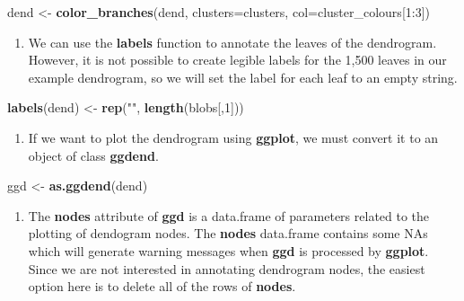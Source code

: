 \documentclass[]{book}
\newenvironment{Shaded}{\begin{snugshade}}{\end{snugshade}}
\newcommand{\KeywordTok}[1]{\textcolor[rgb]{0.13,0.29,0.53}{\textbf{{#1}}}}
\newcommand{\DataTypeTok}[1]{\textcolor[rgb]{0.13,0.29,0.53}{{#1}}}
\newcommand{\DecValTok}[1]{\textcolor[rgb]{0.00,0.00,0.81}{{#1}}}
\newcommand{\StringTok}[1]{\textcolor[rgb]{0.31,0.60,0.02}{{#1}}}
\newcommand{\NormalTok}[1]{{#1}}
\providecommand{\tightlist}{%
  \setlength{\itemsep}{0pt}\setlength{\parskip}{0pt}}
\theoremstyle{definition}
\theoremstyle{definition}
\theoremstyle{definition}
\theoremstyle{remark}
\begin{document}
\begin{Shaded}
\begin{Highlighting}[]
\NormalTok{dend <-}\StringTok{ }\KeywordTok{color_branches}\NormalTok{(dend, }\DataTypeTok{clusters=}\NormalTok{clusters, }\DataTypeTok{col=}\NormalTok{cluster_colours[}\DecValTok{1}\NormalTok{:}\DecValTok{3}\NormalTok{])}
\end{Highlighting}
\end{Shaded}

\begin{enumerate}
\def\labelenumi{\arabic{enumi}.}
\setcounter{enumi}{7}
\tightlist
\item
  We can use the \textbf{labels} function to annotate the leaves of the
  dendrogram. However, it is not possible to create legible labels for
  the 1,500 leaves in our example dendrogram, so we will set the label
  for each leaf to an empty string.
\end{enumerate}

\begin{Shaded}
\begin{Highlighting}[]
\KeywordTok{labels}\NormalTok{(dend) <-}\StringTok{ }\KeywordTok{rep}\NormalTok{(}\StringTok{""}\NormalTok{, }\KeywordTok{length}\NormalTok{(blobs[,}\DecValTok{1}\NormalTok{]))}
\end{Highlighting}
\end{Shaded}

\begin{enumerate}
\def\labelenumi{\arabic{enumi}.}
\setcounter{enumi}{8}
\tightlist
\item
  If we want to plot the dendrogram using \textbf{ggplot}, we must
  convert it to an object of class \textbf{ggdend}.
\end{enumerate}

\begin{Shaded}
\begin{Highlighting}[]
\NormalTok{ggd <-}\StringTok{ }\KeywordTok{as.ggdend}\NormalTok{(dend)}
\end{Highlighting}
\end{Shaded}

\begin{enumerate}
\def\labelenumi{\arabic{enumi}.}
\setcounter{enumi}{9}
\tightlist
\item
  The \textbf{nodes} attribute of \textbf{ggd} is a data.frame of
  parameters related to the plotting of dendogram nodes. The
  \textbf{nodes} data.frame contains some NAs which will generate
  warning messages when \textbf{ggd} is processed by \textbf{ggplot}.
  Since we are not interested in annotating dendrogram nodes, the
  easiest option here is to delete all of the rows of \textbf{nodes}.
\end{enumerate}
\end{document}
